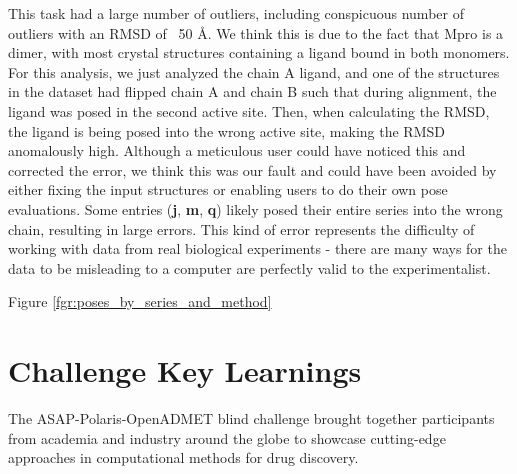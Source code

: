 \documentclass[journal=jcim,manuscript=article]{achemso}
\begin{document}
This task had a large number of outliers, including conspicuous number of outliers with an RMSD of ~50 Å. We think this is due to the fact that Mpro is a dimer, with most crystal structures containing a ligand bound in both monomers. For this analysis, we just analyzed the chain A ligand, and one of the structures in the dataset had flipped chain A and chain B such that during alignment, the ligand was posed in the second active site. Then, when calculating the RMSD, the ligand is being posed into the wrong active site, making the RMSD anomalously high. Although a meticulous user could have noticed this and corrected the error, we think this was our fault and could have been avoided by either fixing the input structures or enabling users to do their own pose evaluations. Some entries (\textbf{j}, \textbf{m}, \textbf{q}) likely posed their entire series into the wrong chain, resulting in large errors. This kind of error represents the difficulty of working with data from real biological experiments - there are many ways for the data to be misleading to a computer are perfectly valid to the experimentalist.

Figure \ref{fgr:poses_by_series_and_method}

\section{Challenge Key Learnings}


The ASAP-Polaris-OpenADMET blind challenge brought together participants from academia and industry around the globe to showcase cutting-edge approaches in computational methods for drug discovery.
\end{document}
